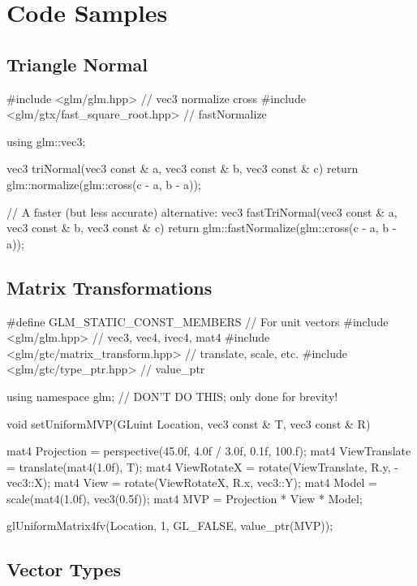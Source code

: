 \documentclass{scrartcl}
\numberwithin{figure}{subsection}
\begin{document}
\newpage{}

\section{Code Samples}

\subsection{Triangle Normal}

\begin{cppcode}
#include <glm/glm.hpp> // vec3 normalize cross
#include <glm/gtx/fast_square_root.hpp> // fastNormalize

using glm::vec3;

vec3 triNormal(vec3 const & a, vec3 const & b, vec3 const & c)
{
  return glm::normalize(glm::cross(c - a, b - a));
}

// A faster (but less accurate) alternative:
vec3 fastTriNormal(vec3 const & a, vec3 const & b, vec3 const & c)
{
  return glm::fastNormalize(glm::cross(c - a, b - a));
}
\end{cppcode}

\subsection{Matrix Transformations}

\begin{cppcode}
#define GLM_STATIC_CONST_MEMBERS // For unit vectors
#include <glm/glm.hpp> // vec3, vec4, ivec4, mat4
#include <glm/gtc/matrix_transform.hpp> // translate, scale, etc.
#include <glm/gtc/type_ptr.hpp> // value_ptr

using namespace glm; // DON'T DO THIS; only done for brevity!

void setUniformMVP(GLuint Location, vec3 const & T, vec3 const & R)
{
  mat4 Projection = perspective(45.0f, 4.0f / 3.0f, 0.1f, 100.f);
  mat4 ViewTranslate = translate(mat4(1.0f), T);
  mat4 ViewRotateX = rotate(ViewTranslate, R.y, -vec3::X);
  mat4 View = rotate(ViewRotateX, R.x, vec3::Y);
  mat4 Model = scale(mat4(1.0f), vec3(0.5f));
  mat4 MVP = Projection * View * Model;

  glUniformMatrix4fv(Location, 1, GL_FALSE, value_ptr(MVP));
}
\end{cppcode}

\subsection{Vector Types}
\end{document}
